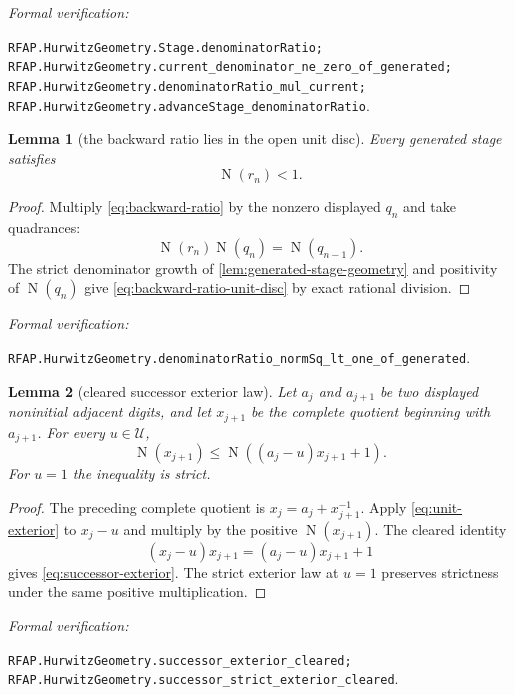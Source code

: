 \documentclass[11pt]{article}
\newtheorem{lemma}[lemma]{Lemma}
\newcommand{\Norm}[1]{\operatorname{N}\!\left(#1\right)}
\newcommand{\leanref}[1]{\par\smallskip\noindent
  \emph{Formal verification:}\par\nobreak
  {\raggedright\nolinkurl{#1}.\par}}
\begin{document}
\leanref{RFAP.HurwitzGeometry.Stage.denominatorRatio;
RFAP.HurwitzGeometry.current_denominator_ne_zero_of_generated;
RFAP.HurwitzGeometry.denominatorRatio_mul_current;
RFAP.HurwitzGeometry.advanceStage_denominatorRatio}

\begin{lemma}[the backward ratio lies in the open unit disc]
\label{lem:backward-ratio-unit-disc}
Every generated stage satisfies
\begin{equation}
\label{eq:backward-ratio-unit-disc}
                              \Norm{r_n}<1.
\end{equation}
\end{lemma}

\begin{proof}
Multiply \eqref{eq:backward-ratio} by the nonzero displayed $q_n$ and take
quadrances:
\[
                       \Norm{r_n}\Norm{q_n}=\Norm{q_{n-1}}.
\]
The strict denominator growth of
\cref{lem:generated-stage-geometry} and positivity of $\Norm{q_n}$ give
\eqref{eq:backward-ratio-unit-disc} by exact rational division.
\end{proof}

\leanref{RFAP.HurwitzGeometry.denominatorRatio_normSq_lt_one_of_generated}

\begin{lemma}[cleared successor exterior law]
\label{lem:successor-exterior}
Let $a_{j}$ and $a_{j+1}$ be two displayed noninitial adjacent digits, and
let $x_{j+1}$ be the complete quotient beginning with $a_{j+1}$.  For every
$u\in\mathcal U$,
\begin{equation}
\label{eq:successor-exterior}
 \Norm{x_{j+1}}
 \le
 \Norm{(a_j-u)x_{j+1}+1}.
\end{equation}
For $u=1$ the inequality is strict.
\end{lemma}

\begin{proof}
The preceding complete quotient is
$x_j=a_j+x_{j+1}^{-1}$.  Apply
\eqref{eq:unit-exterior} to $x_j-u$ and multiply by the positive
$\Norm{x_{j+1}}$.  The cleared identity
\[
                 (x_j-u)x_{j+1}=(a_j-u)x_{j+1}+1
\]
gives \eqref{eq:successor-exterior}.  The strict exterior law at $u=1$
preserves strictness under the same positive multiplication.
\end{proof}

\leanref{RFAP.HurwitzGeometry.successor_exterior_cleared;
RFAP.HurwitzGeometry.successor_strict_exterior_cleared}
\end{document}
